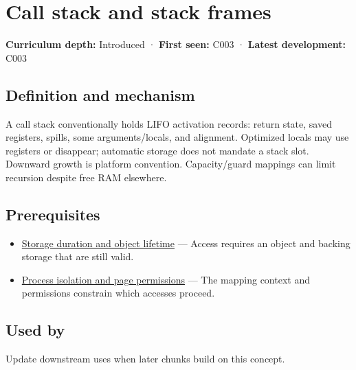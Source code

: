 \hypertarget{appendix-b081b7abe193}{}\label{referencestart:appendix-b081b7abe193}
\section{Call stack and stack frames}\label{appendix-b081b7abe193-call-stack-and-stack-frames}

\textbf{Curriculum depth:} Introduced · \textbf{First seen:} C003 · \textbf{Latest development:} C003

\begin{allmightroledefinition}

\subsection{Definition and mechanism}\label{appendix-b081b7abe193-definition-and-mechanism}

A call stack conventionally holds LIFO activation records: return state, saved registers, spills, some arguments/locals, and alignment. Optimized locals may use registers or disappear; automatic storage does not mandate a stack slot. Downward growth is platform convention. Capacity/guard mappings can limit recursion despite free RAM elsewhere.

\end{allmightroledefinition}

\subsection{Prerequisites}\label{appendix-b081b7abe193-prerequisites}

\begin{itemize}
\tightlist
\item
  \hyperref[appendix-0b104bcba06b]{Storage duration and object lifetime} --- Access requires an object and backing storage that are still valid.
\item
  \hyperref[appendix-c2a9ad1e2b49]{Process isolation and page permissions} --- The mapping context and permissions constrain which accesses proceed.
\end{itemize}

\subsection{Used by}\label{appendix-b081b7abe193-used-by}

Update downstream uses when later chunks build on this concept.

